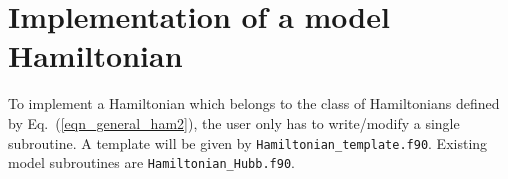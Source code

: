 \section{Implementation of a model Hamiltonian} 
To implement a Hamiltonian which belongs to the class of Hamiltonians defined by Eq.~(\ref{eqn_general_ham2}), 
the user only has to write/modify a single subroutine. A template  will be  given by \texttt{Hamiltonian\_template.f90}. 
Existing model subroutines are \texttt{Hamiltonian\_Hubb.f90}.


